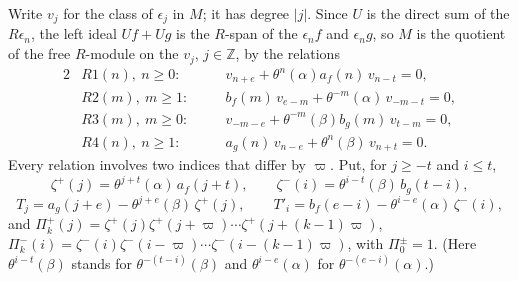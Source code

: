 \documentclass[11pt]{article}
\theoremstyle{definition}
\theoremstyle{remark}
\begin{document}
Write $v_j$ for the class of $\epsilon_j$ in $M$; it has degree $|j|$. Since $U$ is the direct sum of the $R\epsilon_n$, the left ideal $Uf+Ug$ is the $R$-span of the $\epsilon_nf$ and $\epsilon_ng$, so $M$ is the quotient of the free $R$-module on the $v_j$, $j\in\mathbb Z$, by the relations
\begin{alignat*}{2}
&R1(n),\ n\ge0:&\quad &v_{n+e}+\theta^n(\alpha)a_f(n)\,v_{n-t}=0,\\
&R2(m),\ m\ge1:&\quad &b_f(m)\,v_{e-m}+\theta^{-m}(\alpha)\,v_{-m-t}=0,\\
&R3(m),\ m\ge0:&\quad &v_{-m-e}+\theta^{-m}(\beta)b_g(m)\,v_{t-m}=0,\\
&R4(n),\ n\ge1:&\quad &a_g(n)\,v_{n-e}+\theta^n(\beta)\,v_{n+t}=0.
\end{alignat*}
Every relation involves two indices that differ by $\varpi$. Put, for $j\ge-t$ and $i\le t$,
\[
\zeta^+(j)=\theta^{j+t}(\alpha)\,a_f(j+t),\qquad\zeta^-(i)=\theta^{i-t}(\beta)\,b_g(t-i),
\]
\[
T_j=a_g(j+e)-\theta^{j+e}(\beta)\,\zeta^+(j),\qquad T'_i=b_f(e-i)-\theta^{i-e}(\alpha)\,\zeta^-(i),
\]
and $\Pi^+_k(j)=\zeta^+(j)\zeta^+(j+\varpi)\cdots\zeta^+(j+(k-1)\varpi)$, $\Pi^-_k(i)=\zeta^-(i)\zeta^-(i-\varpi)\cdots\zeta^-(i-(k-1)\varpi)$, with $\Pi^\pm_0=1$. (Here $\theta^{i-t}(\beta)$ stands for $\theta^{-(t-i)}(\beta)$ and $\theta^{i-e}(\alpha)$ for $\theta^{-(e-i)}(\alpha)$.)
\end{document}
